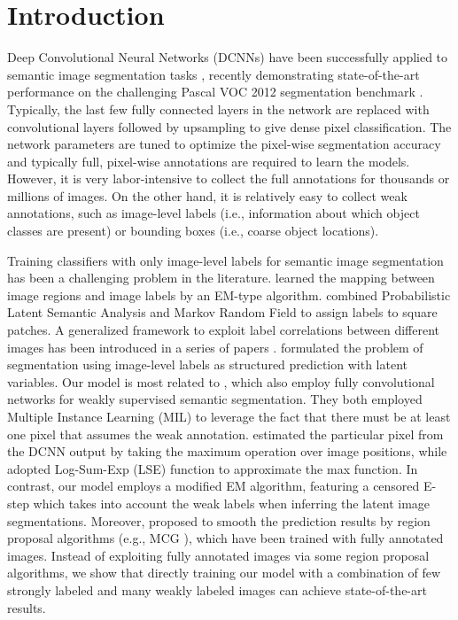 \section{Introduction}
\label{sec:intro}

Deep Convolutional Neural Networks (DCNNs) have been successfully
applied to semantic image segmentation tasks
\citep{farabet2013learning, pinheiro2014recurrent,
  eigen2014predicting}, recently demonstrating state-of-the-art
performance on the challenging Pascal VOC 2012 segmentation benchmark
\citep{chen2014semantic, mostajabi2014feedforward,
  long2014fully}. Typically, the last few fully connected layers in
the network are replaced with convolutional layers followed by
upsampling \citep{long2014fully, papandreou2014untangling} to give
dense pixel classification. The network parameters are tuned to
optimize the pixel-wise segmentation accuracy and typically full,
pixel-wise annotations are required to learn the models. However, it
is very labor-intensive to collect the full annotations for thousands
or millions of images. On the other hand, it is relatively easy to
collect weak annotations, such as image-level labels (i.e.,
information about which object classes are present) or bounding boxes
(i.e., coarse object locations).

Training classifiers with only image-level labels for semantic image
segmentation has been a challenging problem in the
literature. \citet{duygulu2002object} learned the mapping between
image regions and image labels by an EM-type
algorithm. \citet{verbeek2007region} combined Probabilistic Latent
Semantic Analysis and Markov Random Field to assign labels to square
patches. A generalized framework to exploit label correlations between
different images has been introduced in a series of papers
\citep{vezhnevets2010towards, vezhnevets2011weakly,
  vezhnevets2012weakly}. \citet{xu2014tell} formulated the problem of
segmentation using image-level labels as structured prediction with
latent variables. Our model is most related to \citet{pathak2014fully,
  pinheiro2014weakly}, which also employ fully convolutional networks
for weakly supervised semantic segmentation. They both employed
Multiple Instance Learning (MIL) to leverage the fact that there must
be at least one pixel that assumes the weak
annotation. \citet{pathak2014fully} estimated the particular pixel
from the DCNN output by taking the maximum operation over image
positions, while \citet{pinheiro2014weakly} adopted Log-Sum-Exp (LSE)
function to approximate the max function. In contrast, our model
employs a modified EM algorithm, featuring a censored E-step which
takes into account the weak labels when inferring the latent image
segmentations. Moreover, \citet{pinheiro2014weakly} proposed to smooth
the prediction results by region proposal algorithms (e.g., MCG
\citep{arbelaez2014multiscale}), which have been trained with fully
annotated images. Instead of exploiting fully annotated images via
some region proposal algorithms, we show that directly training our
model with a combination of few strongly labeled and many weakly
labeled images can achieve state-of-the-art results.

